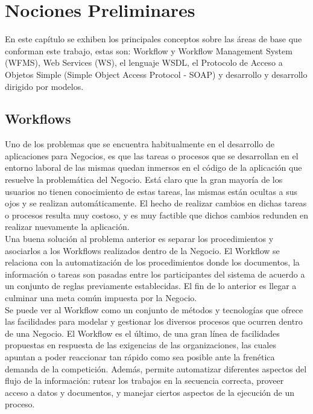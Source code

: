 \chapter{Nociones Preliminares}
\label{Nociones Preliminares}


En este capítulo se exhiben los principales conceptos sobre las áreas de base que conforman este trabajo, estas son: Workflow y Workflow Management System (WFMS), Web Services (WS), el lenguaje WSDL, el Protocolo de Acceso a Objetos Simple (Simple Object Access Protocol - SOAP) y desarrollo y  desarrollo dirigido por modelos.

\section{Workflows}
\label{Workflows}

Uno de los problemas que se encuentra habitualmente en el desarrollo de aplicaciones para Negocios, es que las tareas o procesos que se desarrollan en el entorno laboral de las mismas quedan inmersos en el código de la aplicación que resuelve la problemática del Negocio. Está claro que la gran mayoría de los usuarios no tienen conocimiento de estas tareas, las mismas están ocultas a sus ojos y se realizan automáticamente. El hecho de realizar cambios en dichas tareas o procesos resulta muy costoso, y es muy factible que dichos cambios redunden en realizar nuevamente la aplicación.\\

Una buena solución al problema anterior es separar los procedimientos y asociarlos a los Workflows realizados dentro de la Negocio. El Workflow se relaciona con la automatización de los procedimientos donde los documentos, la información o tareas son pasadas entre los participantes del sistema de acuerdo a un conjunto de reglas previamente establecidas. El fin de lo anterior es llegar a culminar una meta común impuesta por la Negocio.\\

Se puede ver al Workflow como un conjunto de métodos y tecnologías que ofrece las facilidades para modelar y gestionar los diversos procesos que ocurren dentro de una Negocio. El Workflow es el último, de una gran línea de facilidades propuestas en respuesta de las exigencias de las organizaciones, las cuales apuntan a poder reaccionar tan rápido como sea posible ante la frenética demanda de la competición. Además, permite automatizar diferentes aspectos del flujo de la información: rutear los trabajos en la secuencia correcta, proveer acceso a datos y documentos, y manejar ciertos aspectos de la ejecución de un proceso.\\

